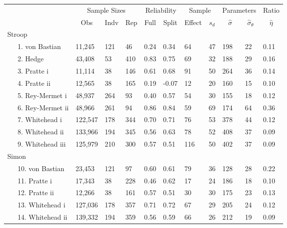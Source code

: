 \documentclass[
  english,
  ,man]{apa6}
\begin{document}
\begin{table}[tbp]
\begin{center}
\begin{threeparttable}
\begin{tabular}{lllllllllll}
\toprule
 & \multicolumn{3}{c}{Sample Sizes} & \multicolumn{2}{c}{Reliability} & \multicolumn{2}{c}{Sample} & \multicolumn{2}{c}{Parameters} & \multicolumn{1}{c}{Ratio} \\
\cmidrule(r){2-4} \cmidrule(r){5-6} \cmidrule(r){7-8} \cmidrule(r){9-10} \cmidrule(r){11-11}
 & \multicolumn{1}{c}{Obs} & \multicolumn{1}{c}{Indv} & \multicolumn{1}{c}{Rep} & \multicolumn{1}{c}{Full} & \multicolumn{1}{c}{Split} & \multicolumn{1}{c}{Effect} & \multicolumn{1}{c}{$s_d$} & \multicolumn{1}{c}{$\hat{\sigma}$} & \multicolumn{1}{c}{$\hat{\sigma}_{\theta}$} & \multicolumn{1}{c}{$\hat{\eta}$}\\
\midrule
Stroop &  &  &  &  &  &  &  &  &  & \\
\ \ \ 1. von Bastian & 11,245 & 121 & 46 & 0.24 & 0.34 & 64 & 47 & 198 & 22 & 0.11\\
\ \ \ 2. Hedge & 43,408 & 53 & 410 & 0.83 & 0.75 & 69 & 32 & 188 & 29 & 0.16\\
\ \ \ 3. Pratte i & 11,114 & 38 & 146 & 0.61 & 0.68 & 91 & 50 & 264 & 36 & 0.14\\
\ \ \ 4. Pratte ii & 12,565 & 38 & 165 & 0.19 & -0.07 & 12 & 20 & 160 & 15 & 0.10\\
\ \ \ 5. Rey-Mermet i & 48,937 & 264 & 93 & 0.40 & 0.57 & 54 & 30 & 155 & 18 & 0.12\\
\ \ \ 6. Rey-Mermet ii & 48,966 & 261 & 94 & 0.86 & 0.84 & 59 & 69 & 174 & 64 & 0.36\\
\ \ \ 7. Whitehead i & 122,547 & 178 & 344 & 0.70 & 0.71 & 76 & 53 & 378 & 44 & 0.12\\
\ \ \ 8. Whitehead ii & 133,966 & 194 & 345 & 0.56 & 0.63 & 78 & 52 & 408 & 37 & 0.09\\
\ \ \ 9. Whitehead iii & 125,979 & 210 & 300 & 0.57 & 0.51 & 116 & 50 & 402 & 37 & 0.09\\
Simon &  &  &  &  &  &  &  &  &  & \\
\ \ \ 10. von Bastian & 23,453 & 121 & 97 & 0.60 & 0.61 & 79 & 36 & 128 & 28 & 0.22\\
\ \ \ 11. Pratte i & 17,343 & 38 & 228 & 0.46 & 0.62 & 17 & 24 & 186 & 18 & 0.10\\
\ \ \ 12. Pratte ii & 12,266 & 38 & 161 & 0.57 & 0.51 & 30 & 30 & 175 & 23 & 0.13\\
\ \ \ 13. Whitehead i & 127,036 & 178 & 357 & 0.71 & 0.72 & 67 & 29 & 205 & 24 & 0.12\\
\ \ \ 14. Whitehead ii & 139,332 & 194 & 359 & 0.56 & 0.59 & 66 & 26 & 212 & 19 & 0.09\\

\end{tabular}
\end{threeparttable}
\end{center}
\end{table}
\end{document}
